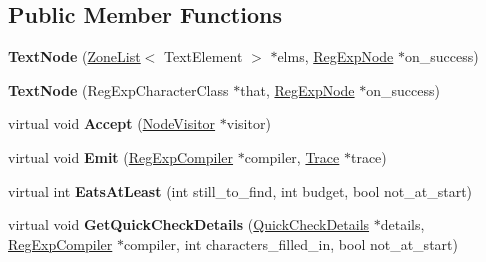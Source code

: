 \subsection*{Public Member Functions}
\begin{DoxyCompactItemize}
\item 
\hypertarget{classv8_1_1internal_1_1_text_node_ade1a7d756d20a4fbada35c081d63e668}{}{\bfseries Text\+Node} (\hyperlink{classv8_1_1internal_1_1_zone_list}{Zone\+List}$<$ Text\+Element $>$ $\ast$elms, \hyperlink{classv8_1_1internal_1_1_reg_exp_node}{Reg\+Exp\+Node} $\ast$on\+\_\+success)\label{classv8_1_1internal_1_1_text_node_ade1a7d756d20a4fbada35c081d63e668}

\item 
\hypertarget{classv8_1_1internal_1_1_text_node_a12739c3e42c1dc350c05bdc86bf6e723}{}{\bfseries Text\+Node} (Reg\+Exp\+Character\+Class $\ast$that, \hyperlink{classv8_1_1internal_1_1_reg_exp_node}{Reg\+Exp\+Node} $\ast$on\+\_\+success)\label{classv8_1_1internal_1_1_text_node_a12739c3e42c1dc350c05bdc86bf6e723}

\item 
\hypertarget{classv8_1_1internal_1_1_text_node_afc1b418856860bb73f833a3dd4655ff9}{}virtual void {\bfseries Accept} (\hyperlink{classv8_1_1internal_1_1_node_visitor}{Node\+Visitor} $\ast$visitor)\label{classv8_1_1internal_1_1_text_node_afc1b418856860bb73f833a3dd4655ff9}

\item 
\hypertarget{classv8_1_1internal_1_1_text_node_ab866c5088ced3f06211220ed8c6fd081}{}virtual void {\bfseries Emit} (\hyperlink{classv8_1_1internal_1_1_reg_exp_compiler}{Reg\+Exp\+Compiler} $\ast$compiler, \hyperlink{classv8_1_1internal_1_1_trace}{Trace} $\ast$trace)\label{classv8_1_1internal_1_1_text_node_ab866c5088ced3f06211220ed8c6fd081}

\item 
\hypertarget{classv8_1_1internal_1_1_text_node_a981ca890ad4e501bfbd9b301dc0e61b6}{}virtual int {\bfseries Eats\+At\+Least} (int still\+\_\+to\+\_\+find, int budget, bool not\+\_\+at\+\_\+start)\label{classv8_1_1internal_1_1_text_node_a981ca890ad4e501bfbd9b301dc0e61b6}

\item 
\hypertarget{classv8_1_1internal_1_1_text_node_a8526e95c8f850c1ac1e690aa86fb1486}{}virtual void {\bfseries Get\+Quick\+Check\+Details} (\hyperlink{classv8_1_1internal_1_1_quick_check_details}{Quick\+Check\+Details} $\ast$details, \hyperlink{classv8_1_1internal_1_1_reg_exp_compiler}{Reg\+Exp\+Compiler} $\ast$compiler, int characters\+\_\+filled\+\_\+in, bool not\+\_\+at\+\_\+start)\label{classv8_1_1internal_1_1_text_node_a8526e95c8f850c1ac1e690aa86fb1486}


\end{DoxyCompactItemize}
